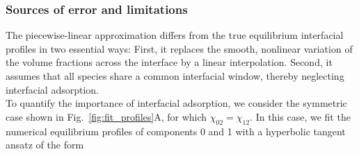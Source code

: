 \documentclass[12pt]{article}
\begin{document}
\subsubsection{Sources of error and limitations}

The piecewise-linear approximation differs from the true equilibrium interfacial
profiles in two essential ways: First, it replaces the smooth, nonlinear variation
of the volume fractions across the interface by a linear interpolation. Second, it
assumes that all species share a common interfacial window, thereby neglecting
interfacial adsorption.\\
To quantify the importance of interfacial adsorption, we consider the symmetric case shown in Fig.~\ref{fig:fit_profiles}A, for which \(\chi_{02}=\chi_{12}\).
In this case, we fit the numerical equilibrium profiles of components 0 and 1 with a hyperbolic tangent ansatz of the form\\
\end{document}
